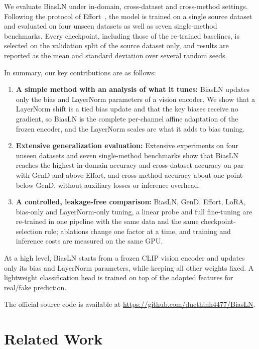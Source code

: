 \documentclass[fonts]{icst}
\newif\ifrevmark\revmarkfalse
\newcommand{\rev}[1]{\ifrevmark{\color{revblue}#1}\else#1\fi}
\begin{document}
We evaluate BiasLN under in-domain, cross-dataset and cross-method settings. Following the protocol of Effort~\cite{yan2025effort}, the model is trained on a single source dataset \rev{and evaluated on four unseen datasets as well as seven single-method benchmarks. Every checkpoint, including those of the re-trained baselines, is selected on the validation split of the source dataset only, and results are reported as the mean and standard deviation over several random seeds.}

In summary, our key contributions are as follows:
\begin{enumerate}
    \item \textbf{A simple \rev{method with an analysis of what it tunes}:} BiasLN updates only the bias and LayerNorm parameters of a vision encoder. \rev{We show that a LayerNorm shift is a tied bias update and that the key biases receive no gradient, so BiasLN is the complete per-channel affine adaptation of the frozen encoder, and the LayerNorm scales are what it adds to bias tuning.}

    \item \textbf{Extensive generalization evaluation:} Extensive experiments on \rev{four} unseen datasets and seven single-method benchmarks \rev{show that BiasLN reaches the highest in-domain accuracy and cross-dataset accuracy on par with GenD and above Effort, and cross-method accuracy about one point below GenD, without auxiliary losses or inference overhead.}

    \item \rev{\textbf{A controlled, leakage-free comparison:} BiasLN, GenD, Effort, LoRA, bias-only and LayerNorm-only tuning, a linear probe and full fine-tuning are re-trained in one pipeline with the same data and the same checkpoint-selection rule; ablations change one factor at a time, and training and inference costs are measured on the same GPU.}
\end{enumerate}
At a high level, BiasLN starts from a frozen CLIP vision encoder and updates only its bias and LayerNorm parameters, while keeping all other weights fixed.
A lightweight classification head is trained on top of the adapted features for real/fake prediction.

The official source code \rev{is available} at \href{https://github.com/ducthinh4477/BiasLN}{\rev{https://github.com/ducthinh4477/BiasLN}}.

\section{Related Work}
\end{document}
